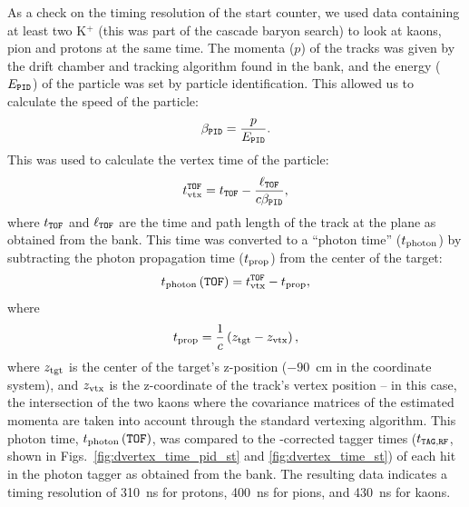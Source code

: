 As a check on the timing resolution of the start counter, we used data containing at least two K$^+$ (this was part of the cascade baryon search) to look at kaons, pion and protons at the same time. The momenta ($p$) of the tracks was given by the drift chamber and tracking algorithm found in the  bank, and the energy ($E_{\mathtt{PID}}$) of the particle was set by particle identification. This allowed us to calculate the speed of the particle:
\begin{equation}
    \beta_{\mathtt{PID}} = \frac{p}{E_{\mathtt{PID}}}.
    \label{eqn:betapid}
\end{equation}
This was used to calculate the vertex time of the particle:
\begin{equation}
    t_{\mathrm{vtx}}^{\mathtt{TOF}} = t_{\mathtt{TOF}} - \frac{\ell_{\mathtt{TOF}}}{c\beta_{\mathtt{PID}}},
    \label{eqn:tvtofpid}
\end{equation}
where $t_{\mathtt{TOF}}$ and $\ell_{\mathtt{TOF}}$ are the time and path length of the track at the  plane as obtained from the  bank. This time was converted to a ``photon time'' ($t_\mathrm{photon}$) by subtracting the photon propagation time ($t_{\mathrm{prop}}$) from the center of the target:
\begin{equation}
    t_\mathrm{photon}\left(\mathtt{TOF}\right) = t_{\mathrm{vtx}}^{\mathtt{TOF}} - t_{\mathrm{prop}},
    \label{eqn:tphotofpid}
\end{equation}
where
\begin{equation}
    t_{\mathrm{prop}} = \frac{1}{c} \left( z_\mathrm{tgt} - z_\mathrm{vtx} \right),
\end{equation}
where $z_\mathrm{tgt}$ is the center of the target's z-position ($-90$~cm in the  coordinate system), and $z_\mathrm{vtx}$ is the z-coordinate of the track's vertex position -- in this case, the intersection of the two kaons where the covariance matrices of the estimated momenta are taken into account through the standard  vertexing algorithm. This photon time, $t_\mathrm{photon}\left(\mathtt{TOF}\right)$, was compared to the -corrected tagger times ($t_{\mathtt{TAG},\mathtt{RF}}$, shown in Figs.~\ref{fig:dvertex_time_pid_st} and \ref{fig:dvertex_time_st}) of each hit in the photon tagger as obtained from the  bank. The resulting data indicates a timing resolution of 310~ns for protons, 400~ns for pions, and 430~ns for kaons.

